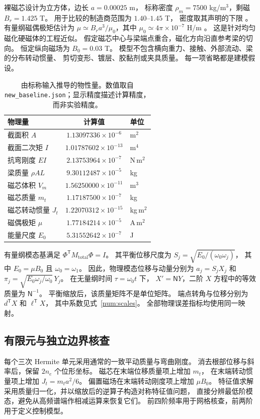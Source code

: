 裸磁芯设计为立方体，边长 $a=0.00025$ m，
标称密度 $\rho_m=7500$ kg/m$^3$，剩磁 $B_r=1.425$ T。
用于比较的制造商范围为 $1.40$--$1.45$ T，
密度取其声明的下限 \citep{smN50}。
有量纲磁偶极矩估计为 $\mu\simeq B_ra^3/\mu_0$，其中
$\mu_0\simeq4\pi\times10^{-7}$ H/m \citep{kjMoment}。
这是针对均匀磁化硬磁体的工程近似。
假定磁芯中心与梁端点重合，磁化方向沿直参考梁的切向。
恒定纵向磁场为 $B_0=0.03$ T。
模型不包含横向重力、接触、外部流动、梁的分布转动惯量、
剪切变形、镀层、胶黏剂或夹具质量。
每一项省略都是建模假设。

\begin{table}[t]
\centering
\caption{由标称输入推导的物性量。数值取自
\texttt{new\_baseline.json}；显示精度描述计算精度，而非实验精度。}
\label{sx:properties}
\setlength{\tabcolsep}{3pt}
\begin{tabular}{lcl}
\toprule
物理量 & 计算值 & 单位\\
\midrule
截面积 $A$ & $1.13097336\times10^{-6}$ & m$^2$ \\
截面二次矩 $I$ & $1.01787602\times10^{-13}$ & m$^4$ \\
抗弯刚度 $EI$ & $2.13753964\times10^{-7}$ & N\,m$^2$ \\
梁质量 $\rho AL$ & $9.30112487\times10^{-5}$ & kg \\
磁芯体积 $V_m$ & $1.56250000\times10^{-11}$ & m$^3$ \\
磁芯质量 $m_t$ & $1.17187500\times10^{-7}$ & kg \\
磁芯转动惯量 $J_t$ & $1.22070312\times10^{-15}$ & kg\,m$^2$ \\
磁偶极矩 $\mu$ & $1.77184214\times10^{-5}$ & A\,m$^2$ \\
能量尺度 $E_0$ & $5.31552642\times10^{-7}$ & J \\
\bottomrule
\end{tabular}
\end{table}

有量纲模态基满足 $\Phi^{\mathsf T}M_{\mathrm{total}}\Phi=I$。
其平衡位移尺度为 $S_j=\sqrt{E_0/(\omega_0\omega_j)}$，
其中 $E_0=\mu B_0$ 且 $\omega_0=\omega_1$。
因此，物理模态位移与动量分别为 $a_j=S_jX_j$ 和
$\pi_j=\sqrt{E_0\omega_j/\omega_0}\,Y_j$。
在无量纲时间 $\tau=\omega_0t$ 下，
$X'=\mathsf NY$，二阶 $X$ 方程中的等效质量为 $\mathsf N^{-1}$。
平衡缩放后，该质量矩阵不是单位矩阵。
端点转角与位移分别为 $d^{\mathsf T}X$ 和 $\ell^{\mathsf T}X$，
其中系数见式~\eqref{num:scales}。
全部物理误差指标均使用同一映射。

\subsection{有限元与独立边界核查}
\label{sx:fe}
每个三次 Hermite 单元采用通常的一致平动质量与弯曲刚度。
消去根部位移与斜率后，保留 $2n_e$ 个位形坐标。
磁芯在末端位移质量项上增加 $m_t$，
在末端转动惯量项上增加 $J_t=m_ta^2/6$。
偏置磁场在末端转动刚度项上增加 $\mu B_0$。
特征值求解采用质量归一化，并以缩放后的逆算子构造对称特征值问题，
直接分辨最低阶模态，避免从高频谱端作相减运算来恢复它们。
前四阶频率用于网格核查，前两阶用于定义控制模型。

